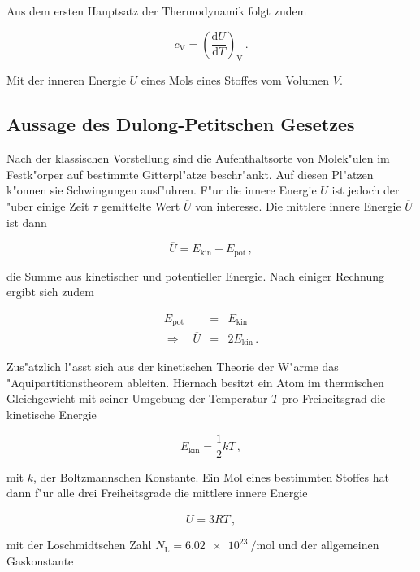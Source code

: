 		Aus dem ersten Hauptsatz der Thermodynamik folgt zudem

		\begin{equation*}
			c_\mathrm{V} = \left(\frac{\mathrm{d}U}{\mathrm{d}T}\right)_\mathrm{V} \,.
		\end{equation*}

		Mit der inneren Energie $U$ eines Mols eines Stoffes vom Volumen $V$.

	\subsection{Aussage des Dulong-Petitschen Gesetzes}
	\label{subsec:dulong-petit}
		Nach der klassischen Vorstellung sind die Aufenthaltsorte von Molek"ulen im Festk"orper auf bestimmte Gitterpl"atze beschr"ankt.
		Auf diesen Pl"atzen k"onnen sie Schwingungen ausf"uhren. F"ur die innere Energie $U$ ist jedoch der "uber einige Zeit $\tau$ gemittelte Wert $\overline{U}$ von interesse.
		Die mittlere innere Energie $\overline{U}$ ist dann

		\begin{equation*}
			\overline{U} = E_\mathrm{kin} + E_\mathrm{pot} \,,
		\end{equation*}

		die Summe aus kinetischer und potentieller Energie.
		Nach einiger Rechnung ergibt sich zudem

		\begin{eqnarray*}
			E_\mathrm{pot} & = & E_\mathrm{kin} \\
			\Rightarrow \quad \overline{U} & = & 2 E_\mathrm{kin} \,.
		\end{eqnarray*}

		Zus"atzlich l"asst sich aus der kinetischen Theorie der W"arme das "Aquipartitionstheorem ableiten.
		Hiernach besitzt ein Atom im thermischen Gleichgewicht mit seiner Umgebung der Temperatur $T$ pro Freiheitsgrad die kinetische Energie

		\begin{equation*}
			E_\mathrm{kin} = \frac{1}{2}kT \,,
		\end{equation*}

		mit $k$, der Boltzmannschen Konstante. Ein Mol eines bestimmten Stoffes hat dann f"ur alle drei Freiheitsgrade die mittlere innere Energie

		\begin{equation*}
			\overline{U} = 3RT \,,
		\end{equation*}

		mit der Loschmidtschen Zahl $N_\mathrm{L} = \SI{6.02e23}{\per \mol}$ und der allgemeinen Gaskonstante

